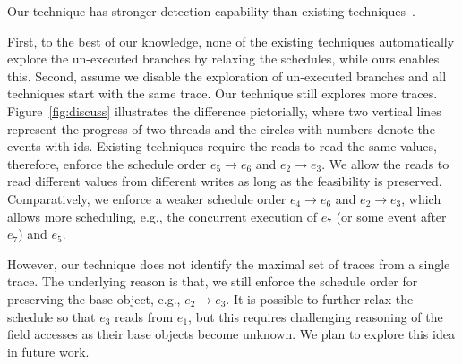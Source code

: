 \begin{mydiscussion}
Our technique has stronger detection capability than existing techniques~\cite{yannis,jeff,said}.
\end{mydiscussion}

First, to the best of our knowledge, none of the existing techniques automatically explore the un-executed branches by relaxing the schedules, while ours enables this.
Second, assume we disable the exploration of un-executed branches and all techniques start with the same trace. Our technique still explores more traces. 
Figure~\ref{fig:discuss} illustrates the difference pictorially, where two vertical lines represent the progress of two threads and the circles with numbers denote the events with ids. 
Existing techniques require the reads to read the same values, therefore, enforce the schedule order $e_5 \rightarrow e_6$ and $e_2\rightarrow e_3$. We allow the reads to read different values from different writes as long as the feasibility is preserved. Comparatively, we  enforce a weaker schedule order  $e_4 \rightarrow e_6$ and $e_2\rightarrow e_3$, which allows more scheduling, e.g., the concurrent execution of $e_7$ (or some event after $e_7$) and $e_5$.

However, our technique does not identify the maximal set of traces from a single trace. The underlying reason is that, we still enforce the schedule order for preserving the base object, e.g., $e_2\rightarrow e_3$. It is possible to further relax the schedule so that $e_3$ reads from $e_1$, but this requires challenging reasoning of the field accesses as their base objects become unknown. We plan to explore this idea in future work.




